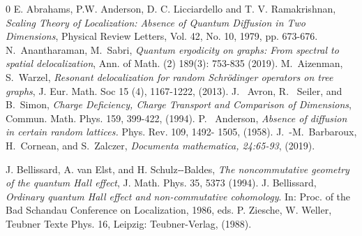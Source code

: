 \documentclass[reqno,12pt,letterpaper]{amsart}
\numberwithin{equation}{section}
\begin{document}
\begin{thebibliography}{0}
 E. Abrahams, P.W. Anderson, D. C. Licciardello and T. V. Ramakrishnan, \emph{Scaling Theory
of Localization: Absence of Quantum Diffusion in Two Dimensions}, Physical
Review Letters, Vol. 42, No. 10, 1979, pp. 673-676.
 N.~Anantharaman, M.~Sabri, {\em Quantum ergodicity on graphs: From spectral to spatial delocalization},
Ann. of Math. (2) 189(3): 753-835 (2019).
 M.~Aizenman, S.~Warzel, {\em Resonant delocalization for random Schrödinger operators on tree graphs},
J. Eur. Math. Soc 15 (4), 1167-1222, (2013).
 J. ~Avron, R. ~Seiler, and B.~Simon, \emph{Charge Deficiency, Charge Transport
and Comparison of Dimensions}, Commun. Math. Phys. 159, 399-422, (1994).
 P. ~Anderson, \emph{Absence of diffusion in certain random lattices.} Phys. Rev. 109, 1492-
1505, (1958).
 J.~-M.~Barbaroux, H.~Cornean, and S.~Zalczer, \emph{Documenta mathematica, 24:65-93}, (2019).

 J. Bellissard, A. van Elst, and H. Schulz‐-Baldes, \emph{The noncommutative geometry of the quantum Hall effect},
J. Math. Phys. 35, 5373 (1994).
 J. Bellissard, \emph{Ordinary quantum Hall effect and non-commutative cohomology}. In: Proc. of
the Bad Schandau Conference on Localization, 1986, eds. P. Ziesche, W. Weller, Teubner
Texte Phys. 16, Leipzig: Teubner-Verlag, (1988).


\end{thebibliography}
\end{document}
